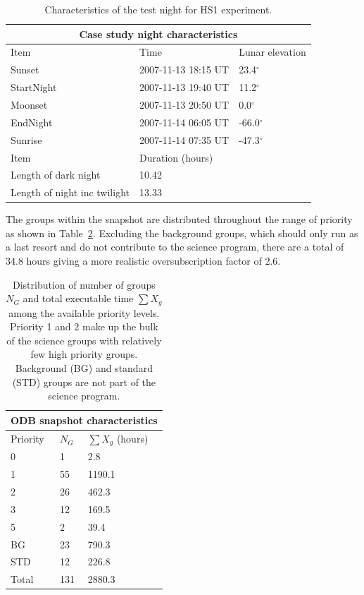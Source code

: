 \begin{table}[htbp]
\begin{center}
\begin{tabular}{lll}
\toprule
\multicolumn{3}{c}{Case study night characteristics} \\
\midrule
Item       &  Time               & Lunar elevation \\
\midrule
Sunset     & 2007-11-13 18:15 UT & 23.4$^{\circ}$\\
StartNight & 2007-11-13 19:40 UT & 11.2$^{\circ}$\\
Moonset    & 2007-11-13 20:50 UT & 0.0$^{\circ}$\\
EndNight   & 2007-11-14 06:05 UT & -66.0$^{\circ}$\\
Sunrise    & 2007-11-14 07:35 UT & -47.3$^{\circ}$\\
\midrule
Item                         & Duration (hours) \\
\midrule
Length of dark night         & 10.42\\
Length of night inc twilight & 13.33\\
\bottomrule
\end{tabular}
\caption[Characteristics of test night for HS1 experiment]{Characteristics of the test night for HS1 experiment.}
\label{tab:mam_nights}
\end{center}
\end{table}


The groups within the snapshot are distributed throughout the range of priority as shown in Table~\ref{tab:priority_distrib}. Excluding the background groups, which should only run as a last resort and do not contribute to the science program, there are a total of 34.8 hours giving a more realistic oversubscription factor of 2.6.

\begin{table}
\begin{center}
\begin{tabular}{llp{6cm}}
\toprule
\multicolumn{3}{c}{ODB snapshot characteristics} \\
\midrule
Priority & $N_G$ & $\sum{X_g}$ (hours)\\
\midrule
0 & 1 & 2.8\\
1 & 55 & 1190.1\\
2 & 26 & 462.3\\
3 & 12 & 169.5\\
5 & 2  & 39.4\\
BG & 23 & 790.3\\
STD & 12 & 226.8\\
\midrule
Total & 131 & 2880.3\\
\bottomrule
\end{tabular}
\caption[Distribution of number of groups between priority levels for HS1 experiment]{Distribution of number of groups $N_G$ and total executable time $\sum{X_g}$ among the available priority levels. Priority 1 and 2 make up the bulk of the science groups with relatively few high priority groups. Background (BG) and standard (STD) groups are not part of the science program.}
\label{tab:priority_distrib}
\end{center}
\end{table}

